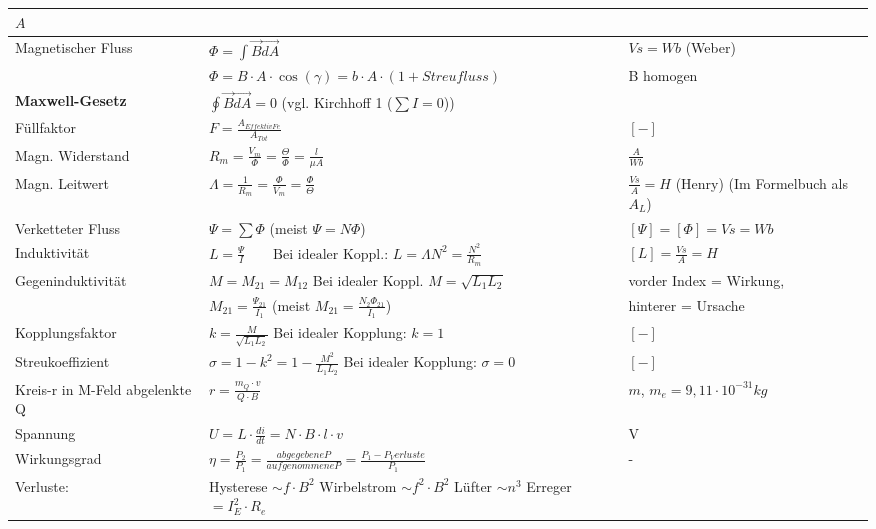 \begin{tabular}[c]{ | p{5cm} | p{8cm} | p{4cm} | }
            $A$ \\
            \hline
            Magnetischer Fluss &
            $\Phi = \int \vec{B} \vec{dA}$ &
            $Vs = Wb$ (Weber) \\
            &
            $\Phi = B \cdot A \cdot \cos(\gamma)=b \cdot A \cdot (1+Streufluss)$ &
            B homogen \\
            \hline
            \textbf{Maxwell-Gesetz} &
            $\oint \vec{B} \vec{dA} = 0$ (vgl. Kirchhoff 1 ($\sum I = 0$)) &
            \\
            \hline
            Füllfaktor &
            $F=\frac{A_{Effektiv Fe}}{A_{Tot}}$ &
            $[-]$ \\
            \hline
            Magn. Widerstand &
            $R_m = \frac{V_m}{\Phi} = \frac{\Theta}{\Phi} = \frac{l}{\mu A} $ &
            $\frac{A}{Wb}$ \\
            \hline
            Magn. Leitwert &
            $\Lambda = \frac{1}{R_m} = \frac{\Phi}{V_m}=\frac{\Phi}{\Theta}$ &
            $\frac{Vs}{A} = H$ (Henry) (Im Formelbuch als $A_L$) \\
            \hline
            Verketteter Fluss &
            $\Psi = \sum \Phi $ (meist $\Psi = N \Phi$) &
            $[\Psi] = [\Phi] = Vs = Wb$ \\
            \hline
            Induktivität &
            $L = \frac{\Psi}{I}  \qquad \text{Bei idealer Koppl.: } L = \Lambda N^2 = \frac{N^2}{R_m} $ &
            $[L] = \frac{Vs}{A} = H$ \\
            \hline
            Gegeninduktivität &
            $M = M_{21} = M_{12}$ Bei idealer Koppl. $M = \sqrt{L_1 L_2}$ &
            vorder Index = Wirkung, \\
            &
            $M_{21} = \frac{\Psi_{21}}{I_1}$  (meist $M_{21} = \frac{N_2 \Phi_{21}}{I_1}$) &
            hinterer = Ursache \\
            \hline
            Kopplungsfaktor &
            $k = \frac{M}{\sqrt{L_1 L_2}}$ Bei idealer Kopplung: $k = 1$ &
            $[-]$ \\
            \hline
            Streukoeffizient &
            $\sigma = 1 - k^2 = 1 -\frac{M^2}{L_1 L_2}$ Bei idealer Kopplung: $\sigma = 0$ &
            $[-]$ \\
            \hline
            Kreis-r in M-Feld abgelenkte Q &
            $r = \frac{m_Q \cdot v}{Q \cdot B}$ &
            $m$, $ m_e = 9,11 \cdot 10^{-31} kg$ \\
            \hline
            Spannung &
            $U = L \cdot \frac{di}{dt}=N \cdot B \cdot l \cdot v$ &
            V \\
            \hline
            Wirkungsgrad &
            $\eta = \frac{P_2}{P_1}=\frac{abgegebene P}{aufgenommene P}= \frac{P_1 - P_Verluste}{P_1}$ &
            - \\
            \hline
            Verluste: &
            Hysterese $\sim f \cdot B^2$ \qquad Wirbelstrom $\sim f^2 \cdot B^2$ \qquad Lüfter $ \sim n^3$ \qquad\qquad Erreger $ = I_E ^2 \cdot R_e $ &
            \\
            \hline
        \end{tabular}
